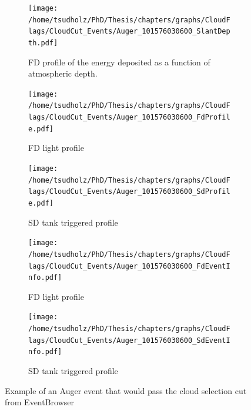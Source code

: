 \begin{figure}[h]
\centering
 \vspace{2cm}
  \begin{subfigure}[b]{\textwidth}
  \centering
  \texttt{[image: /home/tsudholz/PhD/Thesis/chapters/graphs/CloudFlags/CloudCut\_Events/Auger\_101576030600\_SlantDepth.pdf]}
  \caption{FD profile of the energy deposited as a function of atmospheric depth.}
  \end{subfigure}
 \vspace{0.5cm}
  \begin{subfigure}[b]{0.45\textwidth}
  	\centering
  	\texttt{[image: /home/tsudholz/PhD/Thesis/chapters/graphs/CloudFlags/CloudCut\_Events/Auger\_101576030600\_FdProfile.pdf]}
  	\caption{FD light profile}
  \end{subfigure}
  \begin{subfigure}[b]{0.45\textwidth}
  	\centering
  	\texttt{[image: /home/tsudholz/PhD/Thesis/chapters/graphs/CloudFlags/CloudCut\_Events/Auger\_101576030600\_SdProfile.pdf]}
  	\caption{SD tank triggered profile}
  \end{subfigure}

  \begin{subfigure}[b]{0.45\textwidth}
  	\centering
	\texttt{[image: /home/tsudholz/PhD/Thesis/chapters/graphs/CloudFlags/CloudCut\_Events/Auger\_101576030600\_FdEventInfo.pdf]}
  	\caption{FD light profile}
  \end{subfigure}
  \begin{subfigure}[b]{0.45\textwidth}
  	\centering
	\texttt{[image: /home/tsudholz/PhD/Thesis/chapters/graphs/CloudFlags/CloudCut\_Events/Auger\_101576030600\_SdEventInfo.pdf]}
  	\caption{SD tank triggered profile}
  \end{subfigure}
  \caption{Example of an Auger event that would pass the cloud selection cut from EventBrowser}
\end{figure}

